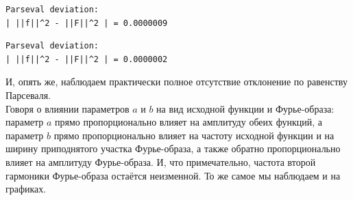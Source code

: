 \documentclass[a4paper]{article}
\begin{document}
\begin{minipage}{0.33\textwidth}
\begin{lstlisting}[caption={$a = 2$, $b = 1$}, numbers=none]
Parseval deviation:
| ||f||^2 - ||F||^2 | = 0.0000009
\end{lstlisting}
\end{minipage}\hfill
\begin{minipage}{0.33\textwidth}
\begin{lstlisting}[caption={$a = 2$, $b = 2$}, numbers=none]
Parseval deviation:
| ||f||^2 - ||F||^2 | = 0.0000002
\end{lstlisting}
\end{minipage}
И, опять же, наблюдаем практически полное отсутствие отклонение по равенству Парсеваля.\\[0.5em]
Говоря о влиянии параметров $a$ и $b$ на вид исходной функции и Фурье-образа: параметр $a$ прямо пропорционально влияет на амплитуду обеих функций, а параметр $b$ прямо пропорционально влияет на частоту исходной функции и на ширину приподнятого участка Фурье-образа, а также обратно пропорционально влияет на амплитуду Фурье-образа. И, что примечательно, частота второй гармоники Фурье-образа остаётся неизменной. То же самое мы наблюдаем и на графиках.
\end{document}
